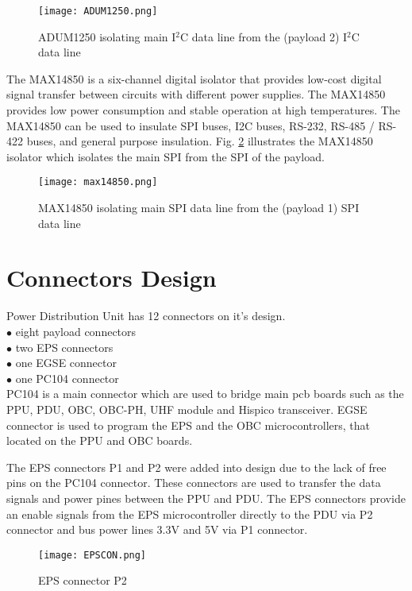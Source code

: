  \begin{figure}[h]
 	\centering
 	\texttt{[image: ADUM1250.png]}
 	\caption{ADUM1250 isolating main I$^2$C data line from the (payload 2) I$^2$C data line }
 	\label{fig: adum}
 \end{figure} 

\cite{31} The MAX14850 is a six-channel digital isolator that provides low-cost digital signal transfer between circuits with different power supplies. The MAX14850 provides low power consumption and stable operation at high temperatures. The MAX14850 can be used to insulate SPI buses, I2C buses, RS-232, RS-485 / RS-422 buses, and general purpose insulation. Fig. \ref{fig: adum122} illustrates the MAX14850 isolator which isolates the main SPI from the SPI of the payload.

\begin{figure}[h]
	\centering
	\texttt{[image: max14850.png]}
	\caption{MAX14850 isolating main SPI data line from the (payload 1) SPI data line }
	\label{fig: adum122}
\end{figure} 

\section{Connectors Design}

Power Distribution Unit has 12 connectors on it's design. \\

$\bullet$ eight payload connectors\\
$\bullet$ two EPS connectors\\
$\bullet$ one EGSE connector\\
$\bullet$ one PC104 connector\\

PC104 is a main connector which are used to bridge main pcb boards such as the PPU, PDU, OBC, OBC-PH, UHF module and Hispico transceiver.
EGSE connector is used to program the EPS and the OBC microcontrollers, that located on the PPU and OBC boards.

The EPS connectors P1 and P2 were added into design due to the lack of free pins on the PC104 connector. These connectors are used to transfer the data signals and power pines between the PPU and PDU. The EPS connectors provide an enable signals from the EPS microcontroller directly to the PDU via P2 connector and bus power lines 3.3V and 5V via P1 connector.

  \begin{figure}[h]
  	\centering
  	\texttt{[image: EPSCON.png]}
  	\caption{EPS connector P2}
  	\label{fig: EPSCON}
  \end{figure} 

